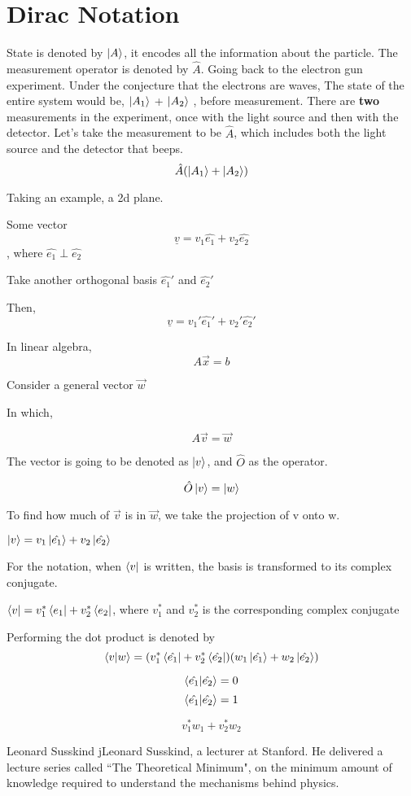 \documentclass{report}
\begin{document}
\section{Dirac Notation}

State is denoted by $\ket{A}$, it encodes all the information about the particle. The measurement operator is denoted by $\hat{A}$. Going back to the electron gun experiment. Under the conjecture that the electrons are waves, The state of the entire system would be, $\ket{A_1}$ + $\ket{A_2}$ , before measurement. There are \textbf{two} measurements in the experiment, once with the light source and then with the detector. Let's take the measurement to be $\hat{A}$, which includes both the light source and the detector that beeps. 
$$\hat{A}(\ket{A_1} + \ket{A_2})$$

Taking an example, a 2d plane.

Some vector $$\underline{v} = v_1 \hat{e_1} + v_2 \hat{e_2}$$, where $\hat{e_1} \perp \hat{e_2}$

Take another orthogonal basis $\hat{e_1}'$ and $\hat{e_2}'$

Then, $$\underline{v} = v_1' \hat{e_1}' + v_2' \hat{e_2}'$$

 In linear algebra,
$$A\vec{x} = b$$

Consider a general vector $\vec{w}$

In which,

$$A\vec{v} = \vec{w}$$

The vector is going to be denoted as $\ket{v}$, and $\hat{O}$ as the operator.

$$\hat{O}\ket{v} = \ket{w}$$

To find how much of $\vec{v}$ is in $\vec{w}$, we take the projection of v onto w.

$\ket{v} = v_1 \ket{\hat{e_1}}+ v_2 \ket{\hat{e_2}}$

For the notation, when $\bra{v}$ is written, the basis is transformed to its complex conjugate.

$\bra{v} = v_1^* \bra{e_1} + v_2^*\bra{e_2}$, where $v_1^*$ and $v_2^*$ is the corresponding complex conjugate

Performing the dot product is denoted by $$\braket{v | w} = (v_1^*\bra{\hat{e_1}}+ v_2^*\bra{\hat{e_2}})(w_1 \ket{\hat{e_1}} + w_2 \ket{\hat{e_2}})$$

$$\braket{\hat{e_1} | \hat{e_2}}=0$$ $$\braket{\hat{e_1} | \hat{e_2}}=1$$

$$v_1^*w_1 + v_2^*w_2$$

\begin{Reference}{Leonard Susskind}
jLeonard Susskind, a lecturer at Stanford.
He delivered a lecture series called ``The Theoretical Minimum", on the minimum amount of knowledge required to understand the mechanisms behind physics.
\end{Reference}
\end{document}
